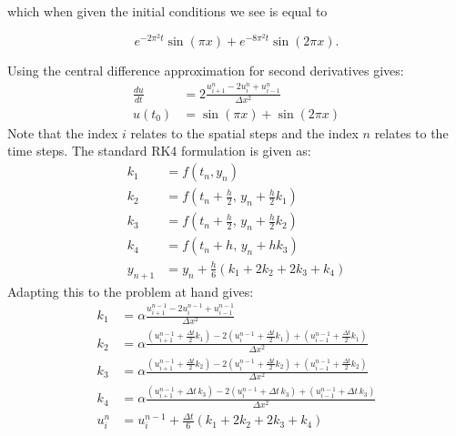 \documentclass{article}
\begin{document}
which when given the initial conditions we see is equal to 

\[
e^{-2\pi^{2}t}\sin\left(\pi x\right)+e^{-8\pi^{2}t}\sin(2\pi x).
\]

Using the central difference approximation for second derivatives gives:
\begin{equation}
    \begin{aligned}
        \frac{du}{dt} &= 2\frac{u_{i+1}^n - 2u_i^n + u_{i-1}^n}{\Delta x^2}\\
        u(t_0) &= \sin(\pi x) + \sin(2\pi x)
    \end{aligned}
\end{equation}
Note that the index $i$ relates to the spatial steps and the index $n$ relates to the time steps. The standard RK4 formulation is given as:
\begin{equation}
    \begin{aligned}
        k_1 &= f(t_n, y_n) \\
        k_2 &= f\left(t_n + \frac{h}{2},\, y_n + \frac{h}{2}k_1\right) \\
        k_3 &= f\left(t_n + \frac{h}{2},\, y_n + \frac{h}{2}k_2\right) \\
        k_4 &= f(t_n + h,\, y_n + hk_3) \\
        y_{n+1} &= y_n + \frac{h}{6}\left(k_1 + 2k_2 + 2k_3 + k_4\right)
    \end{aligned}
\end{equation}
Adapting this to the problem at hand gives:
\begin{equation}
    \begin{aligned}
        k_1 &= \alpha \frac{u_{i+1}^{n-1} - 2u_i^{n-1} + u_{i-1}^{n-1}}{\Delta x^2} \\
        k_2 &= \alpha \frac{
            \left(u_{i+1}^{n-1} + \frac{\Delta t}{2}k_1\right)
            - 2\left(u_i^{n-1} + \frac{\Delta t}{2}k_1\right)
            + \left(u_{i-1}^{n-1} + \frac{\Delta t}{2}k_1\right)
        }{\Delta x^2} \\
        k_3 &= \alpha \frac{
            \left(u_{i+1}^{n-1} + \frac{\Delta t}{2}k_2\right)
            - 2\left(u_i^{n-1} + \frac{\Delta t}{2}k_2\right)
            + \left(u_{i-1}^{n-1} + \frac{\Delta t}{2}k_2\right)
        }{\Delta x^2} \\
        k_4 &= \alpha \frac{
            \left(u_{i+1}^{n-1} + \Delta t\, k_3\right)
            - 2\left(u_i^{n-1} + \Delta t\, k_3\right)
            + \left(u_{i-1}^{n-1} + \Delta t\, k_3\right)
        }{\Delta x^2} \\
        u_i^{n} &= u_i^{n-1} + \frac{\Delta t}{6} \left( k_1 + 2k_2 + 2k_3 + k_4 \right)
    \end{aligned}
\end{equation}
\end{document}
